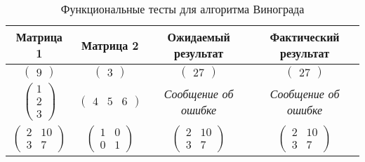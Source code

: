 \begin{table}[H]
    \small
	\begin{center}
		\caption{Функциональные тесты для алгоритма Винограда}
		\label{tbl:func-tests-winograd}  
            \begin{tabular}{|c|c|c|c|}
            \hline
            \textbf{Матрица 1} & \textbf{Матрица 2} & \textbf{Ожидаемый результат} & \textbf{Фактический результат} \\
            \hline
            $\begin{pmatrix}
                9 
            \end{pmatrix}$ &
            $\begin{pmatrix}
                3
            \end{pmatrix}$ &
            $\begin{pmatrix}
                27
            \end{pmatrix}$ &
            $\begin{pmatrix}
                27
            \end{pmatrix}$ \\
            \hline
            $\begin{pmatrix}
                1 \\ 2 \\ 3
            \end{pmatrix}$ &
            $\begin{pmatrix}
                4 & 5 & 6
            \end{pmatrix}$ &
            \textit{Сообщение об ошибке} &
            \textit{Сообщение об ошибке} \\
            \hline
            $\begin{pmatrix}
                2 & 10 \\
                3 & 7
            \end{pmatrix}$ &
            $\begin{pmatrix}
                1 & 0 \\
                0 & 1
            \end{pmatrix}$ &
            $\begin{pmatrix}
                2 & 10 \\
                3 & 7
            \end{pmatrix}$ &
            $\begin{pmatrix}
                2 & 10 \\
                3 & 7
            \end{pmatrix}$ \\

\end{tabular}
\end{center}
\end{table}
